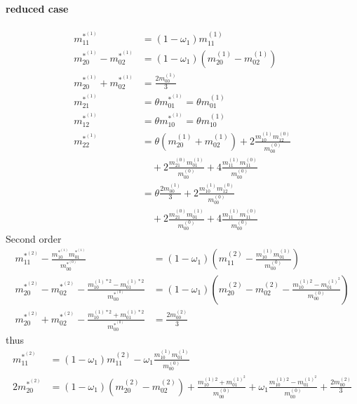 \documentclass{article}
\begin{document}
  \paragraph{reduced case}
  \begin{align}
      m_{11}^{*^{(1)}} & = (1-\omega_1) m_{11}^{(1)}  \tag{R1}
      \\
      m_{20}^{*^{(1)}} - m_{02}^{*^{(1)}}
        & = (1-\omega_1) (m_{20}^{(1)} - m_{02}^{(1)})  \tag{R2}
        \\
      m_{20}^{*^{(1)}} + m_{02}^{*^{(1)}}
        & =  \frac{2 m_{00}^{(1)}}{3}  \tag{R3}
        \\
      m_{21}^{*^{(1)}} & = \theta m_{01}^{*^{(1)}} = \theta m_{01}^{(1)}  \tag{R4}
      \\
      m_{12}^{*^{(1)}} & = \theta m_{10}^{*^{(1)}} = \theta m_{10}^{(1)}  \tag{R5}
      \\
      m_{22}^{*^{(1)}} & =  \theta (m_{20}^{(1)} + m_{02}^{(1)}) \tag{R6}
        + 2\frac{ m_{10}^{(1)} m_{12}^{(0)} }{m_{00}^{(0)}}
        \\\nonumber&\quad
        + 2\frac{ m_{21}^{(0)} m_{01}^{(1)} }{m_{00}^{(0)}}
        + 4\frac{ m_{11}^{(1)} m_{11}^{(0)} }{m_{00}^{(0)}}
        \\\nonumber&= \theta \frac{2 m_{00}^{(1)}}{3} + 2\frac{ m_{10}^{(1)} m_{12}^{(0)} }{m_{00}^{(0)}}
        \\\nonumber&\quad
        + 2\frac{ m_{21}^{(0)} m_{01}^{(1)} }{m_{00}^{(0)}}
        + 4\frac{ m_{11}^{(1)} m_{11}^{(0)} }{m_{00}^{(0)}}
  \end{align}
Second order
  \begin{align}
      m_{11}^{*^{(2)}} - \frac{ m_{10}^{*^{(1)}}m_{01}^{*^{(1)}}}{m_{00}^{*^{(0)}}} & = (1-\omega_1)\left(m_{11}^{(2)} - \frac{ m_{10}^{(1)}m_{01}^{(1)}}{m_{00}^{(0)}}\right)  \tag{R7}
      \\
      m_{20}^{*^{(2)}}-m_{02}^{*^{(2)}} - \frac{ m_{10}^{(1)*2} - m_{01}^{(1)*2}}{m_{00}^{*^{(0)}}}
      & = (1-\omega_1) \left(m_{20}^{(2)}-m_{02}^{(2)} - \frac{ m_{10}^{(1)2} - m_{01}^{{(1)}^2}}{m_{00}^{(0)}}\right)  \tag{R8}
      \\
      m_{20}^{*^{(2)}}+m_{02}^{*^{(2)}} - \frac{ m_{10}^{(1)*2} + m_{01}^{(1)*2}}{m_{00}^{*^{(0)}}} & = \frac{2 m_{00}^{(2)}}{3} \tag{R9}
  \end{align}
  thus
  \begin{align}
      m_{11}^{*^{(2)}} & = (1-\omega_1)m_{11}^{(2)} - \omega_1\frac{ m_{10}^{(1)}m_{01}^{(1)}}{m_{00}^{(0)}} \tag{R10}
      \\
      2m_{20}^{*^{(2)}} & = (1-\omega_1) \left(m_{20}^{(2)}-m_{02}^{(2)}\right)
      + \frac{ m_{10}^{(1)2} + m_{01}^{{(1)}^2}}{m_{00}^{(0)}} + \omega_1 \frac{ m_{10}^{(1)2} - m_{01}^{{(1)}^2}}{m_{00}^{(0)}}
      + \frac{2 m_{00}^{(2)}}{3}  \tag{R11}
  \end{align}
\end{document}
